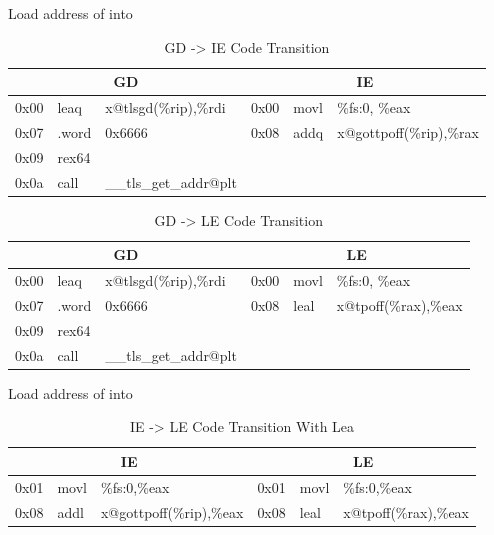 \begin{description}
\item[]
  Load address of  into 

\begin{table}[H]
\Hrule
\caption{GD -> IE Code Transition}
\begin{center}
\code\small{
\begin{tabular}{lll|lll}
\multicolumn{3}{c}{GD} & \multicolumn{3}{c}{IE} \\
\hline
0x00 & leaq  & x@tlsgd(\%rip),\%rdi	& 0x00 & movl  & \%fs:0, \%eax \\
0x07 & .word & 0x6666			& 0x08 & addq  & x@gottpoff(\%rip),\%rax\\
0x09 & rex64 &				&      &       & \\
0x0a & call  & \_\_tls\_get\_addr@plt	&      &       & \\
\end{tabular}
}
\end{center}
\Hrule
\end{table}

\begin{table}[H]
\Hrule
\caption{GD -> LE Code Transition}
\begin{center}
\code\small{
\begin{tabular}{lll|lll}
\multicolumn{3}{c}{GD} & \multicolumn{3}{c}{LE} \\
\hline
0x00 & leaq  & x@tlsgd(\%rip),\%rdi	& 0x00 & movl  & \%fs:0, \%eax \\
0x07 & .word & 0x6666			& 0x08 & leal  & x@tpoff(\%rax),\%eax\\
0x09 & rex64 &				&      &       & \\
0x0a & call  & \_\_tls\_get\_addr@plt	&      &       & \\
\end{tabular}
}
\end{center}
\Hrule
\end{table}

\item[]
  Load address of  into 

\begin{table}[H]
\Hrule
\caption{IE -> LE Code Transition With Lea}
\begin{center}
\code\small{
\begin{tabular}{lll|lll}
\multicolumn{3}{c}{IE} & \multicolumn{3}{c}{LE} \\
\hline
0x01 & movl & \%fs:0,\%eax		& 0x01 & movl & \%fs:0,\%eax \\
0x08 & addl & x@gottpoff(\%rip),\%eax	& 0x08 & leal & x@tpoff(\%rax),\%eax \\
\end{tabular}
}
\end{center}
\Hrule
\end{table}


\end{description}
